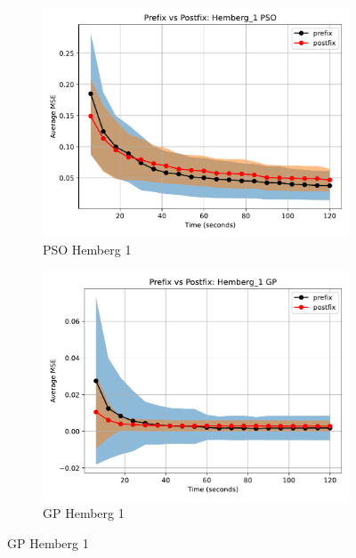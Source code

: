 \documentclass[runningheads]{llncs}
\begin{document}
\begin{figure}
    \vspace{0.5cm}
    
    \begin{subfigure}[b]{0.4\textwidth}
        \includegraphics[width=\linewidth, keepaspectratio]{Hemberg_Benchmarks/PrePostHemberg_1PSO.pdf}
        \caption{PSO Hemberg 1}
        \label{subfig:hemberg_1_PSO}
    \end{subfigure}
    \begin{subfigure}[b]{0.4\textwidth}
        \includegraphics[width=\linewidth, keepaspectratio]{Hemberg_Benchmarks/PrePostHemberg_1GP.pdf}
        \caption{GP Hemberg 1}
        \label{subfig:hemberg_1_GP}
    \end{subfigure}
    

\end{figure}
\end{document}
